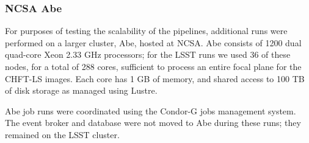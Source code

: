 \subsubsection{NCSA Abe}

For purposes of testing the scalability of the pipelines, additional runs were
performed on a larger cluster, Abe, hosted at NCSA. Abe consists of 1200
dual quad-core Xeon 2.33 GHz processors; for the LSST runs we used 36 of these 
nodes, for a total of 288 cores, sufficient to process an entire focal plane 
for the CHFT-LS images. Each core has 1 GB of memory, and shared access
to 100 TB of disk storage as managed using Lustre.

Abe job runs were coordinated using the Condor-G jobs management system.
The event broker and database were not moved to Abe during these runs;
they remained on the LSST cluster.
